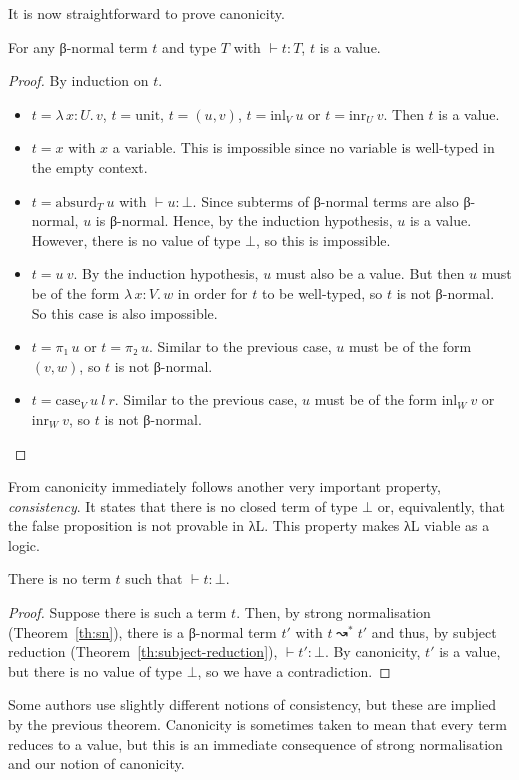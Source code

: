\documentclass{article}
\theoremstyle{definition}
\newcommand{\Lam}[2]{λ\,#1.\, #2}
\newcommand{\unit}{\mathrm{unit}}
\newcommand{\absurd}{\mathrm{absurd}}
\newcommand{\inl}{\ensuremath{\mathrm{inl}}}
\newcommand{\inr}{\ensuremath{\mathrm{inr}}}
\newcommand{\case}{\mathrm{case}}
\begin{document}
It is now straightforward to prove canonicity.

\begin{theorem}[Canonicity]
  For any β-normal term $t$ and type $T$ with $⊢ t : T$, $t$ is a value.
\end{theorem}

\begin{proof}
  By induction on $t$.
  \begin{itemize}
    \item $t = \Lam{x : U}{v}$, $t = \unit$, $t = (u, v)$, $t = \inl_{V}~u$ or $t = \inr_{U}~v$.
          Then $t$ is a value.
    \item $t = x$ with $x$ a variable.
          This is impossible since no variable is well-typed in the empty context.
    \item $t = \absurd_{T}~u$ with $⊢ u : ⊥$.
          Since subterms of β-normal terms are also β-normal, $u$ is β-normal.
          Hence, by the induction hypothesis, $u$ is a value.
          However, there is no value of type $⊥$, so this is impossible.
    \item $t = u~v$.
          By the induction hypothesis, $u$ must also be a value.
          But then $u$ must be of the form $\Lam{x : V}{w}$ in order for $t$ to be well-typed, so $t$ is not β-normal.
          So this case is also impossible.
    \item $t = π₁~u$ or $t = π₂~u$.
          Similar to the previous case, $u$ must be of the form $(v, w)$, so $t$ is not β-normal.
    \item $t = \case_{V}~u~l~r$.
          Similar to the previous case, $u$ must be of the form $\inl_{W}~v$ or $\inr_{W}~v$, so $t$ is not β-normal.
  \end{itemize}
\end{proof}

From canonicity immediately follows another very important property, \emph{consistency}.
It states that there is no closed term of type $⊥$ or, equivalently, that the false proposition is not provable in λL.
This property makes λL viable as a logic.

\begin{theorem}[Consistency]
  There is no term $t$ such that $⊢ t : ⊥$.
\end{theorem}

\begin{proof}
  Suppose there is such a term $t$.
  Then, by strong normalisation (Theorem~\ref{th:sn}), there is a β-normal term $t'$ with $t ↝^{*} t'$ and thus, by subject reduction (Theorem~\ref{th:subject-reduction}), $⊢ t' : ⊥$.
  By canonicity, $t'$ is a value, but there is no value of type $⊥$, so we have a contradiction.
\end{proof}

Some authors use slightly different notions of consistency, but these are implied by the previous theorem.
Canonicity is sometimes taken to mean that every term reduces to a value, but this is an immediate consequence of strong normalisation and our notion of canonicity.
\end{document}
